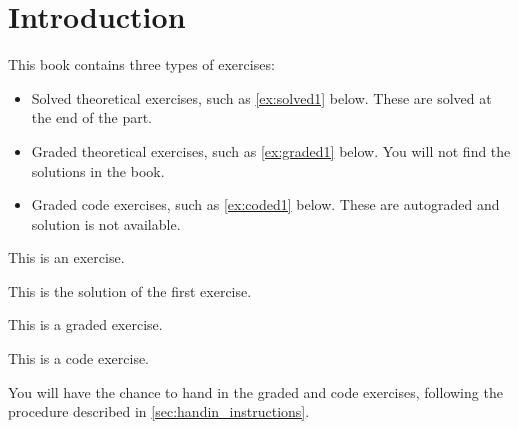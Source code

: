 

\section{Introduction}



This book contains three types of exercises:


\begin{itemize}

  \item Solved theoretical exercises, such as \cref{ex:solved1} below. These are solved at the end of the part.
  \item Graded theoretical exercises, such as \cref{ex:graded1} below. You will not find the solutions in the book.
  \item Graded code exercises, such as \cref{ex:coded1} below. These are autograded and solution is not available.
\end{itemize}

\begin{exercise}
  \label{ex:solved1} This is an exercise.
\end{exercise}
\begin{solution}
  This is the solution of the first exercise.
\end{solution}

\begin{gradedexercise}
  \label{ex:graded1} This is a graded exercise.
\end{gradedexercise}

\begin{codeexercise}
  \label{ex:coded1}
  This is a code exercise.
\end{codeexercise}

You will have the chance to hand in the graded and code exercises, following the procedure described in \cref{sec:handin_instructions}.